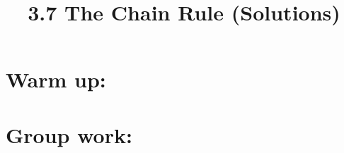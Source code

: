 \documentclass[nooutcomes]{ximera}
\title{3.7 The Chain Rule (Solutions)}
\begin{document}
\begin{abstract}		\end{abstract}
\maketitle

\section*{Warm up:} 

	\begin{freeResponse}
	
	\end{freeResponse}	
	
	
	
	
	

\section*{Group work:}



\begin{problem}
		\begin{freeResponse}
		
		\end{freeResponse}
			
			
	
\end{problem}
















\begin{problem}

			\begin{freeResponse}
			
			\end{freeResponse}
			
			
			
		
\end{problem}
	
	
	
	
	
	
	
	
			
			

\begin{problem}

		\begin{freeResponse}
		
		\end{freeResponse}
		
		
		
	
		
\end{problem}
\end{document}

